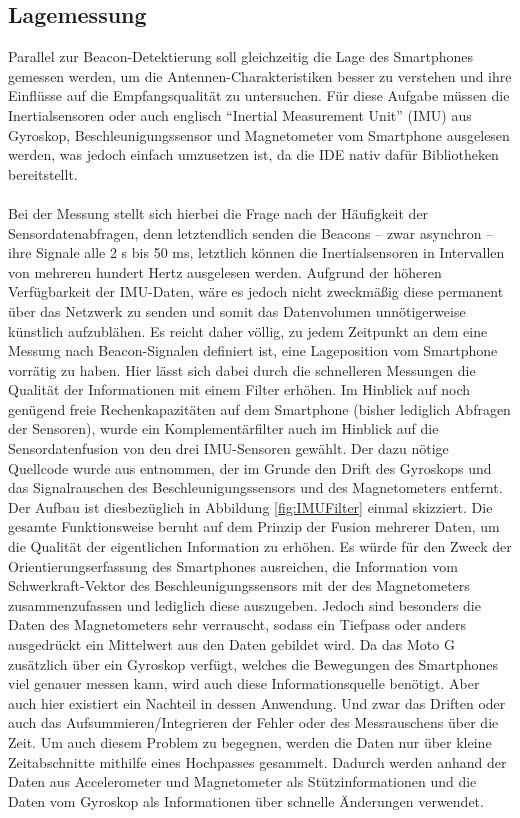 \subsection{Lagemessung}
Parallel zur Beacon-Detektierung soll gleichzeitig die Lage des Smartphones gemessen werden, um die Antennen-Charakteristiken besser zu verstehen und ihre Einflüsse auf die Empfangsqualität zu untersuchen. Für diese Aufgabe müssen die Inertialsensoren oder auch englisch "`Inertial Measurement Unit"' (IMU) aus Gyroskop, Beschleunigungssensor und Magnetometer vom Smartphone ausgelesen werden, was jedoch einfach umzusetzen ist, da die IDE nativ dafür Bibliotheken bereitstellt. \\ \\
Bei der Messung stellt sich hierbei die Frage nach der Häufigkeit der Sensordatenabfragen, denn letztendlich senden die Beacons -- zwar asynchron -- ihre Signale alle 2 s bis 50 ms, letztlich können die Inertialsensoren in Intervallen von mehreren hundert Hertz ausgelesen werden. Aufgrund der höheren Verfügbarkeit der IMU-Daten, wäre es jedoch nicht zweckmäßig diese permanent über das Netzwerk zu senden und somit das Datenvolumen unnötigerweise künstlich aufzublähen. Es reicht daher völlig, zu jedem Zeitpunkt an dem eine Messung nach Beacon-Signalen definiert ist, eine Lageposition vom Smartphone vorrätig zu haben. Hier lässt sich dabei durch die schnelleren Messungen die Qualität der Informationen mit einem Filter erhöhen. Im Hinblick auf noch genügend freie Rechenkapazitäten auf dem Smartphone (bisher lediglich Abfragen der Sensoren), wurde ein Komplementärfilter auch im Hinblick auf die Sensordatenfusion von den drei IMU-Sensoren gewählt. Der dazu nötige Quellcode wurde aus \cite{IMUFilter} entnommen, der im Grunde den Drift des Gyroskops und das Signalrauschen des Beschleunigungssensors und des Magnetometers entfernt. Der Aufbau ist diesbezüglich in Abbildung \ref{fig:IMUFilter} einmal skizziert. Die gesamte Funktionsweise beruht auf dem Prinzip der Fusion mehrerer Daten, um die Qualität der eigentlichen Information zu erhöhen. Es würde für den Zweck der Orientierungserfassung des Smartphones ausreichen, die Information vom Schwerkraft-Vektor des Beschleunigungssensors mit der des Magnetometers zusammenzufassen und lediglich diese auszugeben. Jedoch sind besonders die Daten des Magnetometers sehr verrauscht, sodass ein Tiefpass oder anders ausgedrückt ein Mittelwert aus den Daten gebildet wird. Da das Moto G zusätzlich über ein Gyroskop verfügt, welches die Bewegungen des Smartphones viel genauer messen kann, wird auch diese Informationsquelle benötigt. Aber auch hier existiert ein Nachteil in dessen Anwendung. Und zwar das Driften oder auch das Aufsummieren/Integrieren der Fehler oder des Messrauschens über die Zeit. Um auch diesem Problem zu begegnen, werden die Daten nur über kleine Zeitabschnitte mithilfe eines Hochpasses gesammelt. Dadurch werden anhand der Daten aus Accelerometer und Magnetometer als Stützinformationen und die Daten vom Gyroskop als Informationen über schnelle Änderungen verwendet. 
